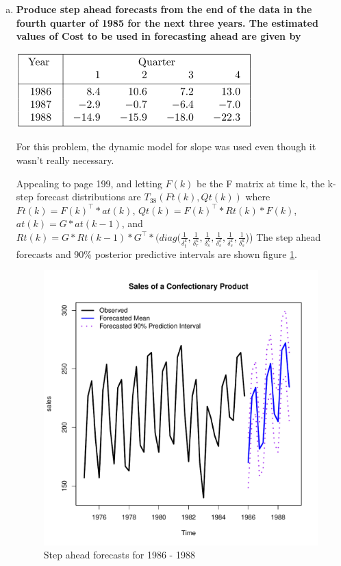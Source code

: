 \documentclass{article}
\begin{document}
\begin{enumerate}[(a)]
		\item \textbf{Produce step ahead forecasts from the end of the data in the fourth quarter of 1985 for the next three years. The estimated values of Cost to be used in forecasting ahead are given by}
		\begin{center}
			\includegraphics[width=0.5\linewidth]{CostFuture}
		\end{center}
		For this problem, the dynamic model for slope was used even though it wasn't really necessary.
		
		Appealing to \cite{harrison1999bayesian} page 199, and letting $F(k)$ be the F matrix at time k, the k-step forecast distributions are $T_{38}(Ft(k),Qt(k))$ where $Ft(k)=F(k)^\top*at(k)$, $Qt(k)=F(k)^\top *Rt(k)*F(k)$,  $at(k)=G*at(k-1)$, and $ Rt(k)=G*Rt(k-1)*G^\top*(diag(\frac{1}{\delta_t^k},\frac{1}{\delta_r^k},\frac{1}{\delta_s^k},\frac{1}{\delta_s^k},\frac{1}{\delta_s^k},\frac{1}{\delta_s^k}$))
		The step ahead forecasts and 90\% posterior predictive intervals are shown figure \ref{fig:stepahead}.
		
		\begin{figure}
			\centering
			\includegraphics[width=0.7\linewidth]{StepAhead}
			\caption{Step ahead forecasts for 1986 - 1988}
			\label{fig:stepahead}
		\end{figure}
		
		
		
	\end{enumerate}

\nocite{prado2010time}
\nocite{harrison1999bayesian}


	
\end{document}
